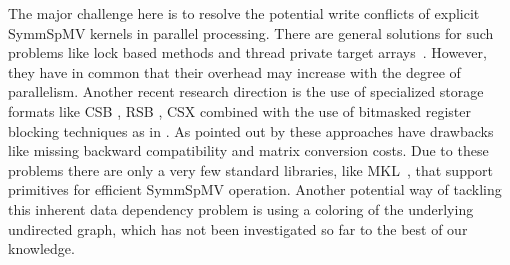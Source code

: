 


The major challenge here is to resolve the potential write conflicts of explicit 
\acrfull{SymmSpMV} kernels in parallel processing.
There are general solutions for such problems like 
lock based methods and thread private target
arrays~\cite{sparseX,thread_private_symm_spmv,Krotkiewski:2010:PSS:1752612.1752682,Mironowicz:2015}. However, they have in common that their overhead may increase with the degree of parallelism.
Another recent research direction is the use of specialized storage formats 
like CSB \cite{CSB}, RSB \cite{RSB}, CSX \cite{sparseX} combined with the use of bitmasked 
register blocking techniques as in \cite{Buluc:2011:RMA:2058524.2059503}. As pointed out 
by \cite{liu2015spmv} these approaches have drawbacks like missing backward compatibility and matrix conversion costs. 
Due to these problems there are only a very few standard libraries, like 
\acrshort{MKL}~\cite{MKL}, that support primitives for efficient \acrshort{SymmSpMV} operation.
Another potential way of tackling this inherent data dependency problem is using a \DTWO coloring 
 of the underlying undirected graph, which has not been investigated so far to the best of our knowledge.

